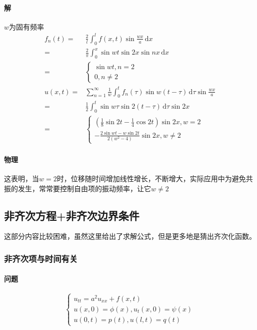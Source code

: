 \paragraph{解}\(w\)为固有频率
\begin{align*}
f_n(t)=&\frac{2}{l}\int_{0}^{l} f(x,t)\sin{\frac{wx}{a}}\,\mathrm{d}x\\
=&\frac{2}{\pi}\int_{0}^{x}\sin{wt}\sin{2x}\sin{nx}\,\mathrm{d}x\\
=&\begin{cases}
	\sin w t,n=2\\
	0,n\neq2
\end{cases}\\
u(x,t)=&\sum_{n=1}^{\infty}{\frac{1}{w}\int_{0}^{t} f_n(\tau)\sin{w\left(t-\tau\right)}\,\mathrm{d}\tau\sin{\tfrac{wx}{a}}}\\
=&\frac{1}{2}\int_{0}^{t}{\sin{w\tau}\sin{2\left(t-\tau\right)}\,\mathrm{d}\tau}\sin{2x}\\
=&
\begin{cases}
	\left(\frac{1}{8}\sin2t-\frac{1}{4}\cos2t\right)\sin2x,w=2\\
	-\frac{2\sin wt-w\sin2t}{2(w^2-4)}\sin2x,w\neq2
\end{cases}
\end{align*}

\paragraph{物理}这表明，当\(w=2\)时，位移随时间增加线性增长，不断增大，实际应用中为避免共振的发生，常常要控制自由项的振动频率，让它\(w\neq2\)

\subsection{非齐次方程+非齐次边界条件}

这部分内容比较困难，虽然这里给出了求解公式，但是更多地是猜出齐次化函数。

\subsubsection{非齐次项与时间有关}

\paragraph{问题}
\[\begin{cases}
u_{tt}=a^2u_{xx}+f(x,t)\\
u(x,0)=\phi(x),u_t(x,0)=\psi(x)\\
u(0,t)=p(t),u(l,t)=q(t)
\end{cases}\]

